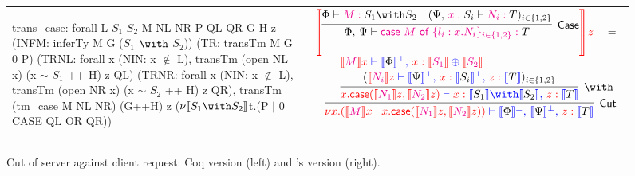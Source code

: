 \begin{figure*}
\begin{tabular*}{\textwidth}{lc}
\begin{coq}
trans_case:
  forall L $S_1$ $S_2$ M NL NR P QL QR G H z
         (INFM: inferTy M G ($S_1$ $\with$ $S_2$))
         (TR: transTm M G 0 P)
         (TRNL: forall x (NIN: x $\notin$ L),
                  transTm (open NL x) (x $\sim$ $S_1$ ++ H) z QL)
         (TRNR: forall x (NIN: x $\notin$ L),
                  transTm (open NR x) (x $\sim$ $S_2$ ++ H) z QR),
  transTm (tm_case M NL NR) (G++H) z
          ($\nu \sem{S_1 \with S_2}$t.(P $\mid$ 0 CASE QL OR QR))
\end{coq} &
\begin{math}
\begin{array}{c}
\colored
\tmSem{
    \inference{
      \Tp{\Phi} \Tpvdash \Tmof{M} \Tp{S_1 \with S_2}  &
      (\Tp{\Psi \comma \Tmof{x}S_i} \Tpvdash
         \Tmof{N_i} \Tp{T})_{\Tp{i \in \set{1,2}}}
    }{Case}{
      \Tp{\Phi \comma \Psi} \Tpvdash
        \Tmof{\key{case}~M~\key{of}~\set{ l_i : x . N_i }_{i \in \set{1,2}}}
           \Tp{T}
    }
}\tm{z}
\quad = \hfill \\ \hfill
\colored
  \inference{
    \tm{\tmsem{M}x} \tpvdash
      \tp{\tpsem{\Phi}^\bot \comma \tmof{x}\tmsem{S_1}\oplus\tmsem{S_2}}
    \\ \vspace{0.1cm} \\
    \inference{
      (\tm{\tmsem{N_i}z} \tpvdash
        \tp{\tpsem{\Psi}^\bot \comma \tmof{x}\tpsem{S_i}^\bot
                               \comma \tmof{z}\tpsem{T}})_{i \in \set{1,2}}
    }{\with}{
      \tm{x.\caseterm(\tmsem{N_1}\tm{z},\tmsem{N_2}\tm{z})} \tpvdash
        \tp{\tmof{x}\tpsem{S_1}\with\tpsem{S_2} \comma \tmof{z}\tpsem{T}}
    }
  }{Cut}{
   \tm{\nu x.(\tmsem{M}x \mid
              x.\caseterm(\tmsem{N_1}\tm{z},\tmsem{N_2}\tm{z}))} \tpvdash
     \tp{\tpsem{\Phi}^\bot \comma \tpsem{\Psi}^\bot \comma \tmof{z}\tpsem{T}}
  }
\end{array}
\end{math}
\end{tabular*}
\caption{Cut of server against client request: Coq version (left) and
  \citeauthor{Wadler:2014}'s version (right).}
\label{fig:trans}
\end{figure*}

